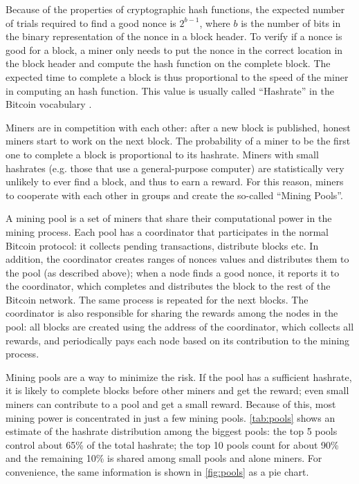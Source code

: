 Because of the properties of cryptographic hash functions, the expected number of trials required to find a good nonce is $2^{b - 1}$, where $b$ is the number of bits in the binary representation of the nonce in a block header.
To verify if a nonce is good for a block, a miner only needs to put the nonce in the correct location in the block header and compute the hash function on the complete block.
The expected time to complete a block is thus proportional to the speed of the miner in computing an hash function.
This value is usually called ``Hashrate'' in the Bitcoin vocabulary \cite{bitcoin_vocabulary}.

Miners are in competition with each other:
after a new block is published, honest miners start to work on the next block.
The probability of a miner to be the first one to complete a block is proportional to its hashrate.
Miners with small hashrates (e.g. those that use a general-purpose computer) are statistically very unlikely to ever find a block, and thus to earn a reward.
For this reason, miners to cooperate with each other in groups and create the so-called ``Mining Pools''.

\bigskip
A mining pool is a set of miners that share their computational power in the mining process.
Each pool has a coordinator that participates in the normal Bitcoin protocol:
it collects pending transactions, distribute blocks etc.
In addition, the coordinator creates ranges of nonces values and distributes them to the pool (as described above);
when a node finds a good nonce, it reports it to the coordinator, which completes and distributes the block to the rest of the Bitcoin network.
The same process is repeated for the next blocks.
The coordinator is also responsible for sharing the rewards among the nodes in the pool:
all blocks are created using the address of the coordinator, which collects all rewards, and periodically pays each node based on its contribution to the mining process.

\bigskip
Mining pools are a way to minimize the risk.
If the pool has a sufficient hashrate, it is likely to complete blocks before other miners and get the reward;
even small miners can contribute to a pool and get a small reward.
Because of this, most mining power is concentrated in just a few mining pools.
\cref{tab:pools} shows an estimate of the hashrate distribution among the biggest pools:
the top \num{5} pools control about \num{65}\% of the total hashrate;
the top \num{10} pools count for about \num{90}\% and the remaining \num{10}\% is shared among small pools and alone miners.
For convenience, the same information is shown in \cref{fig:pools} as a pie chart.

